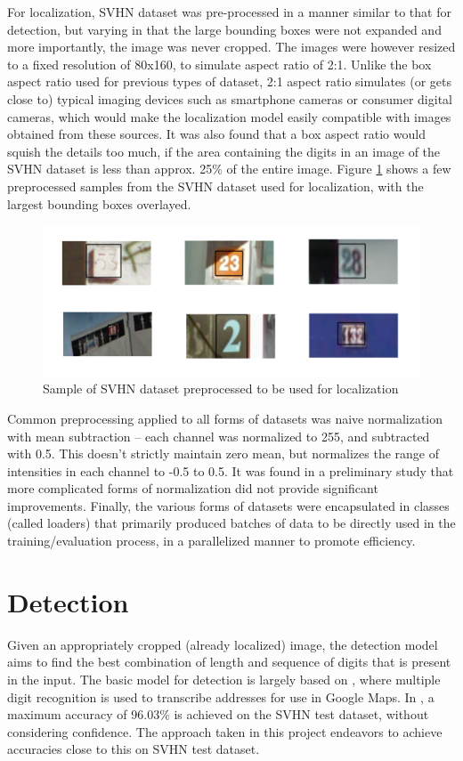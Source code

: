 \documentclass{article}
\begin{document}
	For localization, SVHN dataset was pre-processed in a manner similar to that for detection, but varying in that the large bounding boxes were not expanded and more importantly, the image was never cropped. The images were however resized to a fixed resolution of 80x160, to simulate aspect ratio of 2:1. Unlike the box aspect ratio used for previous types of dataset, 2:1 aspect ratio simulates (or gets close to) typical imaging devices such as smartphone cameras or consumer digital cameras, which would make the localization model easily compatible with images obtained from these sources. It was also found that a box aspect ratio would squish the details too much, if the area containing the digits in an image of the SVHN dataset is less than approx. 25\% of the entire image. Figure \ref{fig:svhn_region_sample} shows a few preprocessed samples from the SVHN dataset used for localization, with the largest bounding boxes overlayed.
	
	\begin{figure}[h]
		\centering
		\includegraphics[scale=0.4]{svhn_region_sample}
		\caption{Sample of SVHN dataset preprocessed to be used for localization}
		\label{fig:svhn_region_sample}
	\end{figure}
	
	Common preprocessing applied to all forms of datasets was naive normalization with mean subtraction -- each channel was normalized to 255, and subtracted with 0.5. This doesn't strictly maintain zero mean, but normalizes the range of intensities in each channel to -0.5 to 0.5.	It was found in a preliminary study that more complicated forms of normalization did not provide significant improvements. Finally, the various forms of datasets were encapsulated in classes (called loaders) that primarily produced batches of data to be directly used in the training/evaluation process, in a parallelized manner to promote efficiency.
	
	\section{Detection}\label{detection}
	Given an appropriately cropped (already localized) image, the detection model aims to find the best combination of length and sequence of digits that is present in the input. The basic model for detection is largely based on \cite{GoodfellowBIAS13}, where multiple digit recognition is used to transcribe addresses for use in Google Maps. In \cite{GoodfellowBIAS13}, a maximum accuracy of 96.03\% is achieved on the SVHN test dataset, without considering confidence. The approach taken in this project endeavors to achieve accuracies close to this on SVHN test dataset.
	
\end{document}
